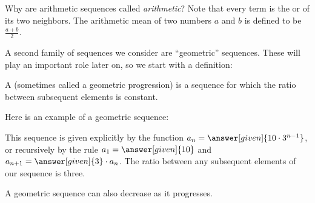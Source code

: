\documentclass{ximera}
\begin{document}
\begin{remark}
Why are arithmetic sequences called \textit{arithmetic}?  Note that
every term is the  or  of its two
neighbors.  The arithmetic mean of two numbers $a$ and $b$ is defined
to be $\frac{a+b}{2}$.
\end{remark}



A second family of sequences we consider are ``geometric''
sequences.  These will play an important role later on, so we start with a definition:

\begin{definition}
  A  (sometimes called a geometric
  progression) is a sequence for which the
  ratio between subsequent elements is constant.
\end{definition}

\begin{example}
  Here is an example of a geometric sequence:
  \begin{image}
  \end{image}
  This sequence is given explicitly by the function $a_n=\answer[given]{10\cdot
    3^{n-1}}$, or recursively by the rule $a_1 = \answer[given]{10}$ and
  $a_{n+1} = \answer[given]{3}\cdot a_n$. The ratio between any subsequent elements of our sequence is three.
\end{example}

A geometric sequence can also decrease as it progresses.
\end{document}
